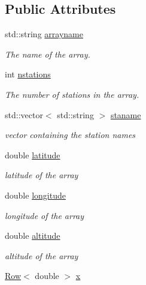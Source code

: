 \subsection*{Public Attributes}
\begin{DoxyCompactItemize}
\item 
std::string \hyperlink{classArray_a12eb22fefdce3d4ae71d0340717c293a}{arrayname}
\begin{DoxyCompactList}\small\item\em The name of the array. \item\end{DoxyCompactList}\item 
int \hyperlink{classArray_a972b05d3cedaf0c1997548c9dc573cd3}{nstations}
\begin{DoxyCompactList}\small\item\em The number of stations in the array. \item\end{DoxyCompactList}\item 
std::vector$<$ std::string $>$ \hyperlink{classArray_a3b7da90274d9406db7fa04960594bb11}{staname}
\begin{DoxyCompactList}\small\item\em vector containing the station names \item\end{DoxyCompactList}\item 
double \hyperlink{classArray_a3d0a097d6c7d27ab0ba7b72a9b2223e1}{latitude}
\begin{DoxyCompactList}\small\item\em latitude of the array \item\end{DoxyCompactList}\item 
double \hyperlink{classArray_a7b0af12d6151bd9bb25e91145b79fb74}{longitude}
\begin{DoxyCompactList}\small\item\em longitude of the array \item\end{DoxyCompactList}\item 
double \hyperlink{classArray_a07662f84d93f59a30c9312b6b546ee39}{altitude}
\begin{DoxyCompactList}\small\item\em altitude of the array \item\end{DoxyCompactList}\item 
\hyperlink{classRow}{Row}$<$ double $>$ \hyperlink{classArray_a378cb85324a4809cd3028668991044ae}{x}

\end{DoxyCompactItemize}

